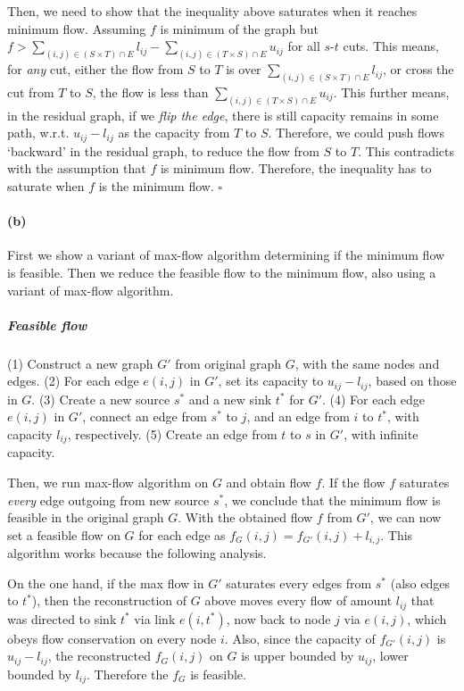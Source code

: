 \documentclass[12pt]{article}
\begin{document}
Then, we need to show that the inequality above saturates when it reaches minimum flow. Assuming $f$ is minimum of the graph but $f > \sum_{(i,j)\in(S\times T)\cap E}l_{ij} - \sum_{(i,j)\in(T\times S)\cap E}u_{ij}$ for all $s$-$t$ cuts. This means, for \emph{any} cut, either the flow from $S$ to $T$ is over $\sum_{(i,j)\in(S\times T)\cap E}l_{ij}$, or cross the cut from $T$ to $S$, the flow is less than $\sum_{(i,j)\in(T\times S)\cap E}u_{ij}$. This further means, in the residual graph, if we \emph{flip the edge}, there is still capacity remains in some path, w.r.t. $u_{ij} - l_{ij}$ as the capacity from $T$ to $S$. Therefore, we could push flows `backward' in the residual graph, to reduce the flow from $S$ to $T$. This contradicts with the assumption that $f$ is minimum flow. Therefore, the inequality has to saturate when $f$ is the minimum flow. $\square$

\paragraph{(b)} First we show a variant of max-flow algorithm determining if the minimum flow is feasible. Then we reduce the feasible flow to the minimum flow, also using a variant of max-flow algorithm. 

\subparagraph{Feasible flow} (1) Construct a new graph $G'$ from original graph $G$, with the same nodes and edges. (2) For each edge $e(i,j)$ in $G'$, set its capacity to $u_{ij} - l_{ij}$, based on those in $G$. (3) Create a new source $s^*$ and a new sink $t^*$ for $G'$. (4) For each edge $e(i,j)$ in $G'$, connect an edge from $s^*$ to $j$, and an edge from $i$ to $t^*$, with capacity $l_{ij}$, respectively. (5) Create an edge from $t$ to $s$ in $G'$, with infinite capacity.

Then, we run max-flow algorithm on $G$ and obtain flow $f$. If the flow $f$ saturates \emph{every} edge outgoing from new source $s^*$, we conclude that the minimum flow is feasible in the original graph $G$. With the obtained flow $f$ from $G'$, we can now set a feasible flow on $G$ for each edge as $f_G(i,j) = f_{G'}(i,j) + l_{i,j}$. This algorithm works because the following analysis.

On the one hand, if the max flow in $G'$ saturates every edges from $s^*$ (also edges to $t^*$), then the reconstruction of $G$ above moves every flow of amount $l_{ij}$ that was directed to sink $t^*$ via link $e(i,t^*)$, now back to node $j$ via $e(i,j)$, which obeys flow conservation on every node $i$. Also, since the capacity of $f_{G'}(i,j)$ is $u_{ij}-l_{ij}$, the reconstructed $f_G(i,j)$ on $G$ is upper bounded by $u_{ij}$, lower bounded by $l_{ij}$. Therefore the $f_G$ is feasible. 
\end{document}
